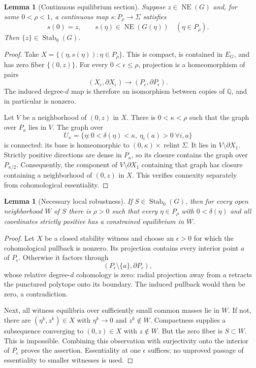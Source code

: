 \documentclass[11pt]{article}
\newcommand{\NE}{\operatorname{NE}}
\newcommand{\Stab}{\operatorname{Stab}_0}
\newcommand{\relint}{\operatorname{relint}}
\newcommand{\Q}{\mathbb Q}
\newtheorem{lemma}[theorem]{Lemma}
\theoremstyle{definition}
\theoremstyle{remark}
\begin{document}
\begin{lemma}[Continuous equilibrium section]\label{lem:section}
Suppose $z\in\NE(G)$ and, for some $0<\rho<1$, a continuous map
$s:P_\rho\to\Sigma$ satisfies
\[
 s(0)=z,\qquad s(\eta)\in\NE(G(\eta))\quad(\eta\in P_\rho).
\]
Then $\{z\}\in\Stab(G)$.
\end{lemma}
\begin{proof}
Take $X=\{(\eta,s(\eta)): \eta\in P_\rho\}$. This is compact, is contained in
$E_G$, and has zero fiber $\{(0,z)\}$. For every $0<\epsilon\le\rho$, projection
is a homeomorphism of pairs
\[
 (X_\epsilon,\partial X_\epsilon)\longrightarrow
 (P_\epsilon,\partial P_\epsilon).
\]
The induced degree-$d$ map is therefore an isomorphism between copies of
$\Q$, and in particular is nonzero.

Let $V$ be a neighborhood of $(0,z)$ in $X$. There is $0<\kappa<\rho$ such
that the graph over $P_\kappa$ lies in $V$. The graph over
\[
 U_\kappa=\{\eta:0<\delta(\eta)<\kappa,\ \eta_i(a)>0\ \forall i,a\}
\]
is connected: its base is homeomorphic to
$(0,\kappa)\times\relint\Sigma$. It lies in $V\setminus\partial X_1$.
Strictly positive directions are dense in $P_\kappa$, so its closure contains
the graph over $P_{\kappa/2}$. Consequently, the component of
$V\setminus\partial X_1$ containing that graph has closure containing a
neighborhood of $(0,z)$ in $X$. This verifies connexity separately from
cohomological essentiality.
\end{proof}

\begin{lemma}[Necessary local robustness]\label{lem:necessary}
If $S\in\Stab(G)$, then for every open neighborhood $W$ of $S$ there is
$\rho>0$ such that every $\eta\in P_\rho$ with $0<\delta(\eta)$ and all
coordinates strictly positive has a constrained equilibrium in $W$.
\end{lemma}
\begin{proof}
Let $X$ be a closed stability witness and choose an $\epsilon>0$ for which
the cohomological pullback is nonzero. Its projection contains every interior
point $a$ of $P_\epsilon$. Otherwise it factors through
\[
 (P_\epsilon\setminus\{a\},\partial P_\epsilon),
\]
whose relative degree-$d$ cohomology is zero: radial projection away from $a$
retracts the punctured polytope onto its boundary. The induced pullback would
then be zero, a contradiction.

Next, all witness equilibria over sufficiently small common masses lie in
$W$. If not, there are $(\eta^k,z^k)\in X$ with $\eta^k\to0$ and
$z^k\notin W$. Compactness supplies a subsequence converging to $(0,z)\in X$
with $z\notin W$. But the zero fiber is $S\subset W$. This is impossible.
Combining this observation with surjectivity onto the interior of
$P_\epsilon$ proves the assertion. Essentiality at one $\epsilon$ suffices;
no unproved passage of essentiality to smaller witnesses is used.
\end{proof}
\end{document}

